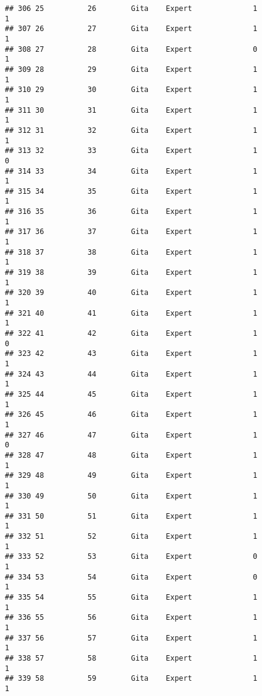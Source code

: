 \documentclass[
]{article}
\begin{document}
\begin{verbatim}
## 306 25          26        Gita    Expert              1                 1
## 307 26          27        Gita    Expert              1                 1
## 308 27          28        Gita    Expert              0                 1
## 309 28          29        Gita    Expert              1                 1
## 310 29          30        Gita    Expert              1                 1
## 311 30          31        Gita    Expert              1                 1
## 312 31          32        Gita    Expert              1                 1
## 313 32          33        Gita    Expert              1                 0
## 314 33          34        Gita    Expert              1                 1
## 315 34          35        Gita    Expert              1                 1
## 316 35          36        Gita    Expert              1                 1
## 317 36          37        Gita    Expert              1                 1
## 318 37          38        Gita    Expert              1                 1
## 319 38          39        Gita    Expert              1                 1
## 320 39          40        Gita    Expert              1                 1
## 321 40          41        Gita    Expert              1                 1
## 322 41          42        Gita    Expert              1                 0
## 323 42          43        Gita    Expert              1                 1
## 324 43          44        Gita    Expert              1                 1
## 325 44          45        Gita    Expert              1                 1
## 326 45          46        Gita    Expert              1                 1
## 327 46          47        Gita    Expert              1                 0
## 328 47          48        Gita    Expert              1                 1
## 329 48          49        Gita    Expert              1                 1
## 330 49          50        Gita    Expert              1                 1
## 331 50          51        Gita    Expert              1                 1
## 332 51          52        Gita    Expert              1                 1
## 333 52          53        Gita    Expert              0                 1
## 334 53          54        Gita    Expert              0                 1
## 335 54          55        Gita    Expert              1                 1
## 336 55          56        Gita    Expert              1                 1
## 337 56          57        Gita    Expert              1                 1
## 338 57          58        Gita    Expert              1                 1
## 339 58          59        Gita    Expert              1                 1

\end{verbatim}
\end{document}
